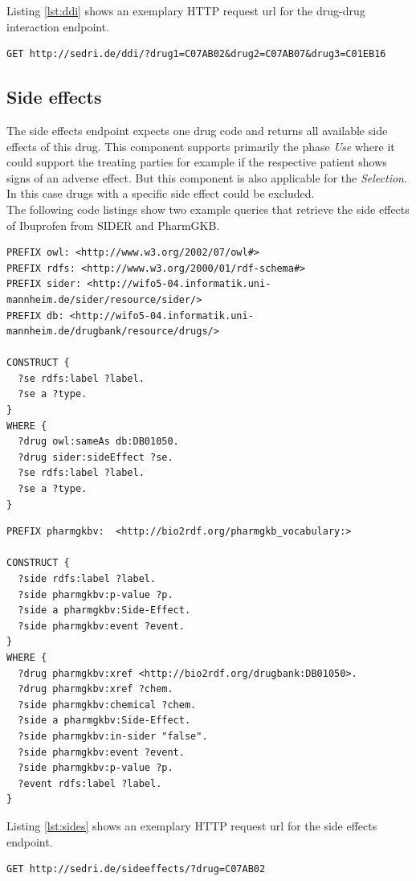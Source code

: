 Listing \ref{lst:ddi} shows an exemplary HTTP request url for the drug-drug interaction endpoint.
\begin{lstlisting}[label=lst:ddi,caption=Example request for the drug-drug interaction endpoint]
  GET http://sedri.de/ddi/?drug1=C07AB02&drug2=C07AB07&drug3=C01EB16
\end{lstlisting}

\subsection*{Side effects}
The side effects endpoint expects one drug code and returns all available side effects of this drug.
This component supports primarily the phase \textit{Use} where it could support the treating parties for example if the respective patient shows signs of an adverse effect.
But this component is also applicable for the \textit{Selection}.
In this case drugs with a specific side effect could be excluded.\\
The following code listings show two example queries that retrieve the side effects of Ibuprofen from SIDER and PharmGKB.
\begin{lstlisting}[caption=Example SIDER query for side effects of Ibuprofen]
PREFIX owl: <http://www.w3.org/2002/07/owl#>
PREFIX rdfs: <http://www.w3.org/2000/01/rdf-schema#>
PREFIX sider: <http://wifo5-04.informatik.uni-mannheim.de/sider/resource/sider/>
PREFIX db: <http://wifo5-04.informatik.uni-mannheim.de/drugbank/resource/drugs/>

CONSTRUCT {
  ?se rdfs:label ?label.
  ?se a ?type.
}
WHERE {
  ?drug owl:sameAs db:DB01050.
  ?drug sider:sideEffect ?se.
  ?se rdfs:label ?label.
  ?se a ?type.
}
\end{lstlisting}
\begin{lstlisting}[caption=Example PharmGKB query for side effects of Ibuprofen that are not listed in SIDER]
PREFIX pharmgkbv:  <http://bio2rdf.org/pharmgkb_vocabulary:>

CONSTRUCT {
  ?side rdfs:label ?label.
  ?side pharmgkbv:p-value ?p.
  ?side a pharmgkbv:Side-Effect.
  ?side pharmgkbv:event ?event.
}
WHERE {
  ?drug pharmgkbv:xref <http://bio2rdf.org/drugbank:DB01050>.
  ?drug pharmgkbv:xref ?chem.
  ?side pharmgkbv:chemical ?chem.
  ?side a pharmgkbv:Side-Effect.
  ?side pharmgkbv:in-sider "false".
  ?side pharmgkbv:event ?event.
  ?side pharmgkbv:p-value ?p.
  ?event rdfs:label ?label.
}
\end{lstlisting}
Listing \ref{lst:sides} shows an exemplary HTTP request url for the side effects endpoint.
\begin{lstlisting}[label=lst:sides,caption=Example request for the side effects endpoint]
  GET http://sedri.de/sideeffects/?drug=C07AB02
\end{lstlisting}

